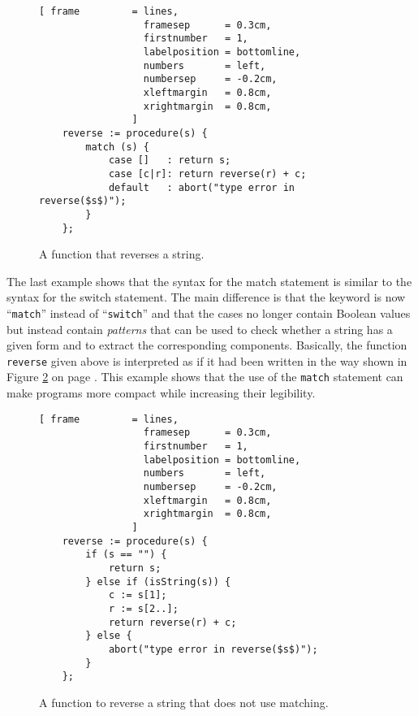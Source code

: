 \begin{figure}[!ht]
\centering
\begin{Verbatim}[ frame         = lines, 
                  framesep      = 0.3cm, 
                  firstnumber   = 1,
                  labelposition = bottomline,
                  numbers       = left,
                  numbersep     = -0.2cm,
                  xleftmargin   = 0.8cm,
                  xrightmargin  = 0.8cm,
                ]
    reverse := procedure(s) {
        match (s) {
            case []   : return s;
            case [c|r]: return reverse(r) + c;
            default   : abort("type error in reverse($s$)");
        }
    };
\end{Verbatim}
\vspace*{-0.3cm}
\caption{A function that reverses a string.}
\label{fig:reverse.stlx}
\end{figure}

The last example shows that the syntax for the match statement  is similar to the syntax for the switch
statement.  The main difference is that the keyword is now ``\texttt{match}'' instead of
``\texttt{switch}'' and that the cases no longer contain Boolean values but instead contain
\emph{patterns} that can be used to check whether a string has a given form and to extract the
corresponding components.  Basically, the function \texttt{reverse} given above is interpreted as if it
had been written in the way shown in Figure \ref{fig:reverse-long.stlx} on page \pageref{fig:reverse-long.stlx}.
This example shows that the use of the \texttt{match} statement can make programs more compact while
increasing their legibility.

\begin{figure}[!ht]
\centering
\begin{Verbatim}[ frame         = lines, 
                  framesep      = 0.3cm, 
                  firstnumber   = 1,
                  labelposition = bottomline,
                  numbers       = left,
                  numbersep     = -0.2cm,
                  xleftmargin   = 0.8cm,
                  xrightmargin  = 0.8cm,
                ]
    reverse := procedure(s) {
        if (s == "") {
            return s;
        } else if (isString(s)) {
            c := s[1];
            r := s[2..];
            return reverse(r) + c;
        } else {
            abort("type error in reverse($s$)");
        }
    };
\end{Verbatim}
\vspace*{-0.3cm}
\caption{A function to reverse a string that does not use matching.}
\label{fig:reverse-long.stlx}
\end{figure}

